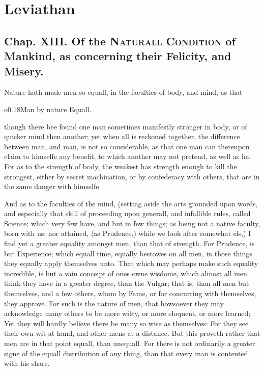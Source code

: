 
\author{Thomas Hobbes}
\chapter[Leviathan, chaps. 13 and 17]{Leviathan}

\section{Chap. XIII. Of the \textsc{Naturall Condition} of
Mankind, as concerning their Felicity, and Misery.}


Nature hath made men so equall, in the faculties of body, and mind; as
that \begin{wrapfigure}[4]{o}{0.18\textwidth}\wrapadj Man by nature
Equall. \end{wrapfigure} though there bee found one man sometimes
manifestly stronger in body, or of quicker mind then another; yet when
all is reckoned together, the difference between man, and man, is not
so considerable, as that one man can thereupon claim to himselfe any
benefit, to which another may not pretend, as well as he. For as to
the strength of body, the weakest has strength enough to kill the
strongest, either by secret machination, or by confederacy with
others, that are in the same danger with himselfe.

And as to the faculties of the mind, (setting aside the arts
grounded upon words, and especially that skill of proceeding upon
generall, and infallible rules, called Science; which very few have,
and but in few things; as being not a native faculty, born with us;
nor attained, (as Prudence,) while we look after somewhat els,) I find
yet a greater equality amongst men, than that of strength. For
Prudence, is but Experience; which equall time, equally bestowes on
all men, in those things they equally apply themselves unto. That
which may perhaps make such equality incredible, is but a vain
conceipt of ones owne wisdome, which almost all men think they have
in a greater degree, than the Vulgar; that is, than all men but
themselves, and a few others, whom by Fame, or for concurring with
themselves, they approve. For such is the nature of men, that
howsoever they may acknowledge many others to be more witty, or more
eloquent, or more learned; Yet they will hardly believe there be many
so wise as themselves: For they see their own wit at hand, and other
mens at a distance. But this proveth rather that men are in that
point equall, than unequall. For there is not ordinarily a greater
signe of the equall distribution of any thing, than that every man is
contented with his share.

